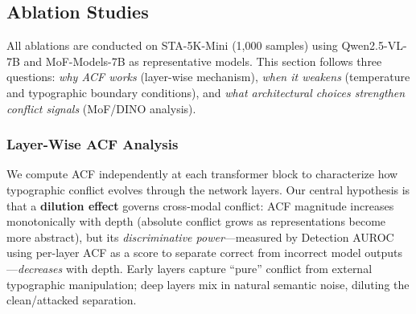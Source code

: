 \documentclass[preprint,12pt]{elsarticle}
\begin{document}
\subsection{Ablation Studies}
\label{sec:ablation}

All ablations are conducted on STA-5K-Mini (1,000 samples) using Qwen2.5-VL-7B and MoF-Models-7B as representative models. This section follows three questions: \emph{why ACF works} (layer-wise mechanism), \emph{when it weakens} (temperature and typographic boundary conditions), and \emph{what architectural choices strengthen conflict signals} (MoF/DINO analysis).

\subsubsection{Layer-Wise ACF Analysis}
\label{sec:ablation_layer}

We compute ACF independently at each transformer block to characterize how typographic conflict evolves through the network layers. Our central hypothesis is that a \textbf{dilution effect} governs cross-modal conflict: ACF magnitude increases monotonically with depth (absolute conflict grows as representations become more abstract), but its \textit{discriminative power}---measured by Detection AUROC using per-layer ACF as a score to separate correct from incorrect model outputs---\textit{decreases} with depth. Early layers capture ``pure'' conflict from external typographic manipulation; deep layers mix in natural semantic noise, diluting the clean/attacked separation.
\end{document}
